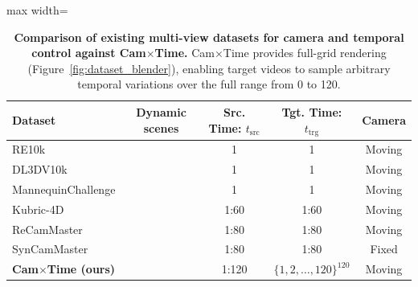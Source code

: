 \documentclass[10pt,twocolumn,letterpaper]{article}
\newcommand{\cmark}{\ding{52}}
\newcommand{\greencmark}{\color{darkgreen}{\cmark}}
\newcommand{\xmark}{\ding{56}}
\newcommand{\redxmark}{\color{darkred}{\xmark}}
\begin{document}
\begin{table}[!t]
  \centering
  \caption{
\textbf{Comparison of existing multi-view datasets for camera and temporal control against Cam$\times$Time.} Cam$\times$Time provides full-grid rendering (Figure~\ref{fig:dataset_blender}), enabling target videos to sample arbitrary temporal variations over the full range from 0 to 120.
  }
  \vspace{-0.2cm}
  \label{tab:dataset-comparison}
  \begin{adjustbox}{max width=\columnwidth}
  \begin{tabular}{l|c|c|c|c}
    \toprule
     Dataset & Dynamic scenes & Src. Time: $t_{\text{src}}$ & Tgt. Time: $t_{\text{trg}}$ & Camera \\
    \midrule
    \midrule
    RE10k \cite{zhou2018stereo} & \redxmark & 1 & 1 & Moving \\
    DL3DV10k \cite{ling2024dl3dv} & \redxmark & 1 & 1 & Moving \\
    MannequinChallenge \cite{rockwell2025dynpose} & \redxmark & 1 & 1 & Moving \\
    Kubric-4D \cite{vanhoorick2024gcd} & \greencmark & 1:60 & 1:60 & Moving \\
    ReCamMaster \cite{Bai2025} & \greencmark & 1:80 & 1:80 & Moving \\
    SynCamMaster \cite{bai2024syncammaster} & \greencmark & 1:80 & 1:80 & Fixed \\
    \midrule
        \rowcolor{Gray}
    \textbf{Cam$\times$Time (ours)} & \greencmark & 1:120 & $\{1, 2, \dots, 120\}^{120}$ & Moving \\
    \bottomrule
  \end{tabular}
  \end{adjustbox}
  \vspace{-3.5mm}
\end{table}

\end{document}
